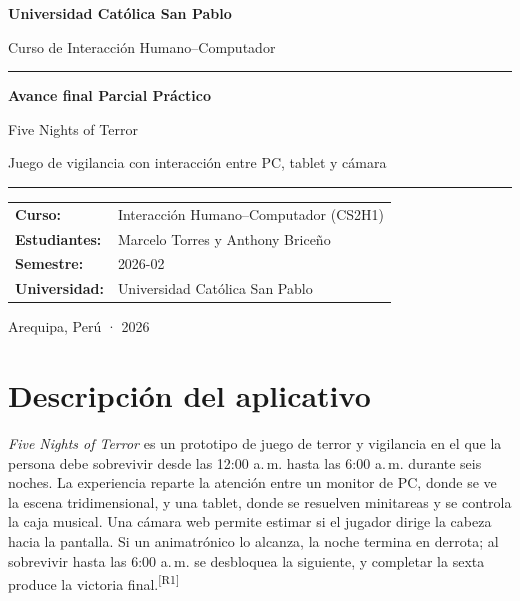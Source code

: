 \documentclass[11pt,a4paper]{article}
\newcommand{\cita}[1]{\textsuperscript{\textcolor{Rojo}{[#1]}}}
\begin{document}
\begin{titlepage}
\thispagestyle{empty}
\begin{center}
\vspace*{1.5cm}
{\Large\bfseries Universidad Católica San Pablo\par}
\vspace{0.35cm}
{\large Curso de Interacción Humano--Computador\par}
\vspace{1.8cm}
{\color{Rojo}\rule{0.75\textwidth}{2pt}\par}
\vspace{0.55cm}
{\Huge\bfseries Avance final Parcial Práctico\par}
\vspace{0.45cm}
{\LARGE Five Nights of Terror\par}
\vspace{0.35cm}
{\large Juego de vigilancia con interacción entre PC, tablet y cámara\par}
\vspace{0.55cm}
{\color{Rojo}\rule{0.75\textwidth}{2pt}\par}
\vspace{1.8cm}
\begin{tabular}{>{\bfseries}p{3.5cm}p{8cm}}
Curso: & Interacción Humano--Computador (CS2H1)\\
Estudiantes: & Marcelo Torres y Anthony Briceño\\
Semestre: & 2026-02\\
Universidad: & Universidad Católica San Pablo\\
\end{tabular}
\vfill
{\large Arequipa, Perú · 2026\par}
\end{center}
\end{titlepage}

\tableofcontents
\clearpage
\setcounter{section}{1}

\section{Descripción del aplicativo}

\textit{Five Nights of Terror} es un prototipo de juego de terror y vigilancia en el que la persona debe sobrevivir desde las 12:00 a.\,m. hasta las 6:00 a.\,m. durante seis noches. La experiencia reparte la atención entre un monitor de PC, donde se ve la escena tridimensional, y una tablet, donde se resuelven minitareas y se controla la caja musical. Una cámara web permite estimar si el jugador dirige la cabeza hacia la pantalla. Si un animatrónico lo alcanza, la noche termina en derrota; al sobrevivir hasta las 6:00 a.\,m. se desbloquea la siguiente, y completar la sexta produce la victoria final.\cita{R1}
\end{document}
